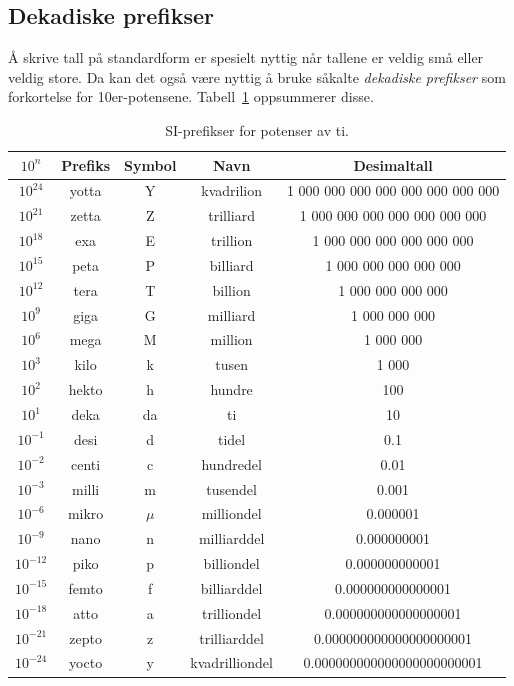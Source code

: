 \subsection*{Dekadiske prefikser}
Å skrive tall på standardform er spesielt nyttig når tallene er veldig små eller veldig store. Da kan det også være nyttig å bruke såkalte \textit{dekadiske prefikser} som forkortelse for 10er-potensene. Tabell~\ref{tab:dekPref} oppsummerer disse.

\begin{table}[h!]
\centering
\renewcommand{\arraystretch}{1.2}
\begin{tabular}{|c|c|c|c|c|}
\hline
\rowcolor{blue!20!black!10}
$10^n$ & Prefiks & Symbol & Navn & Desimaltall \\
\hline
$10^{24}$ & yotta & Y & kvadrilion & 1 000 000 000 000 000 000 000 000 \\
$10^{21}$ & zetta & Z & trilliard  & 1 000 000 000 000 000 000 000 \\
$10^{18}$ & exa   & E & trillion   & 1 000 000 000 000 000 000 \\
$10^{15}$ & peta  & P & billiard   & 1 000 000 000 000 000 \\
$10^{12}$ & tera  & T & billion    & 1 000 000 000 000 \\
$10^{9}$  & giga  & G & milliard   & 1 000 000 000 \\
$10^{6}$  & mega  & M & million    & 1 000 000 \\
$10^{3}$  & kilo  & k & tusen      & 1 000 \\
$10^{2}$  & hekto & h & hundre     & 100 \\
$10^{1}$  & deka  & da& ti         & 10 \\
$10^{-1}$ & desi  & d & tidel      & 0.1 \\
$10^{-2}$ & centi & c & hundredel  & 0.01 \\
$10^{-3}$ & milli & m & tusendel   & 0.001 \\
$10^{-6}$ & mikro & $\mu$ & milliondel & 0.000001 \\
$10^{-9}$ & nano  & n & milliarddel  & 0.000000001 \\
$10^{-12}$& piko  & p & billiondel   & 0.000000000001 \\
$10^{-15}$& femto & f & billiarddel  & 0.000000000000001 \\
$10^{-18}$& atto  & a & trilliondel  & 0.000000000000000001 \\
$10^{-21}$& zepto & z & trilliarddel & 0.000000000000000000001 \\
$10^{-24}$& yocto & y & kvadrilliondel & 0.000000000000000000000001 \\
\hline
\end{tabular}
\label{tab:dekPref}
\caption{SI-prefikser for potenser av ti.}
\end{table}

